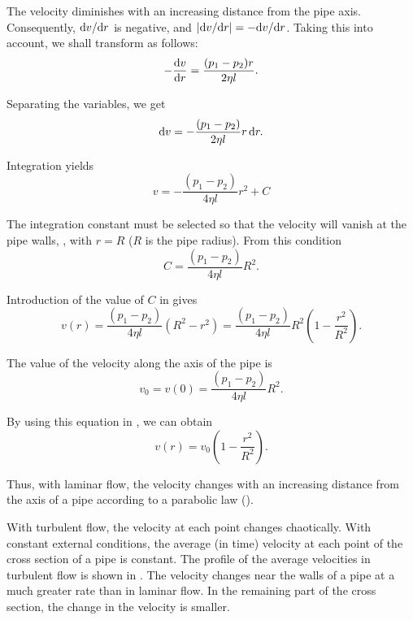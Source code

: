 The velocity diminishes with an increasing distance from the pipe axis. Consequently, $\mathrm{d} v/\mathrm{d} r$ is negative, and $|\mathrm{d} v/\mathrm{d} r|=-\mathrm{d} v/\mathrm{d} r$. Taking this into account, we shall transform  as follows:
\begin{equation*}
	- \frac{\mathrm{d} v}{\mathrm{d} r} = \frac{(p_1 - p_2)r}{2\eta l}.
\end{equation*}

\noindent
Separating the variables, we get
\begin{equation*}
	\mathrm{d} v = -\frac{(p_1 - p_2)}{2\eta l}r\,\mathrm{d} r.
\end{equation*}

\noindent
Integration yields
\begin{equation}\label{eq:9_17}
	v = -\frac{(p_1 - p_2)}{4\eta l}r^2 + C
\end{equation}

\noindent
The integration constant must be selected so that the velocity will vanish at the pipe walls, \ie, with $r=R$ ($R$ is the pipe radius). From this condition
\begin{equation*}
	C = \frac{(p_1 - p_2)}{4\eta l}R^2.
\end{equation*}

\noindent
Introduction of the value of $C$ in  gives
\begin{equation}\label{eq:9_18}
	v(r) = \frac{(p_1 - p_2)}{4\eta l}\left(R^2 - r^2\right) = \frac{(p_1 - p_2)}{4\eta l}R^2\left(1 - \frac{r^2}{R^2}\right).
\end{equation}

\noindent
The value of the velocity along the axis of the pipe is
\begin{equation}\label{eq:9_19}
	v_0 = v(0) = \frac{(p_1 - p_2)}{4\eta l}R^2.
\end{equation}

\noindent
By using this equation in , we can obtain
\begin{equation}\label{eq:9_20}
	v(r) = v_0 \left(1 - \frac{r^2}{R^2}\right).
\end{equation}

\noindent
Thus, with laminar flow, the velocity changes with an increasing distance from the axis of a pipe according to a parabolic law ().

With turbulent flow, the velocity at each point changes chaotically. With constant external conditions, the average (in time) velocity at each point of the cross section of a pipe is constant. The profile of the average velocities in turbulent flow is shown in . The velocity changes near the walls of a pipe at a much greater rate than in laminar flow. In the remaining part of the cross section, the change in the velocity is smaller.

